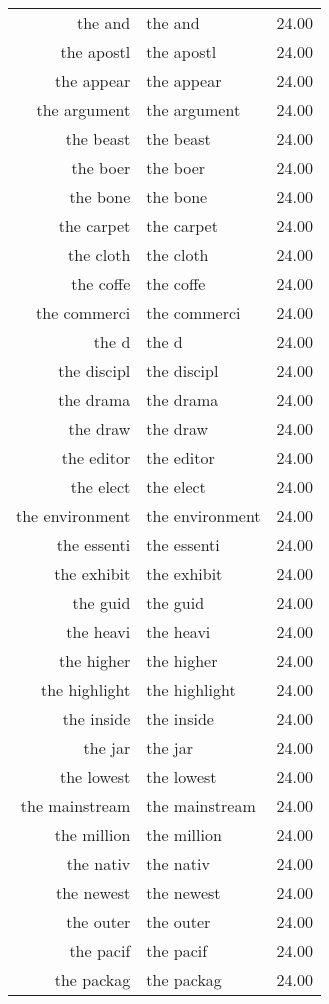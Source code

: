 \begin{table}[ht]
\begin{tabular}{rlr}
  the and & the and & 24.00 \\ 
  the apostl & the apostl & 24.00 \\ 
  the appear & the appear & 24.00 \\ 
  the argument & the argument & 24.00 \\ 
  the beast & the beast & 24.00 \\ 
  the boer & the boer & 24.00 \\ 
  the bone & the bone & 24.00 \\ 
  the carpet & the carpet & 24.00 \\ 
  the cloth & the cloth & 24.00 \\ 
  the coffe & the coffe & 24.00 \\ 
  the commerci & the commerci & 24.00 \\ 
  the d & the d & 24.00 \\ 
  the discipl & the discipl & 24.00 \\ 
  the drama & the drama & 24.00 \\ 
  the draw & the draw & 24.00 \\ 
  the editor & the editor & 24.00 \\ 
  the elect & the elect & 24.00 \\ 
  the environment & the environment & 24.00 \\ 
  the essenti & the essenti & 24.00 \\ 
  the exhibit & the exhibit & 24.00 \\ 
  the guid & the guid & 24.00 \\ 
  the heavi & the heavi & 24.00 \\ 
  the higher & the higher & 24.00 \\ 
  the highlight & the highlight & 24.00 \\ 
  the inside & the inside & 24.00 \\ 
  the jar & the jar & 24.00 \\ 
  the lowest & the lowest & 24.00 \\ 
  the mainstream & the mainstream & 24.00 \\ 
  the million & the million & 24.00 \\ 
  the nativ & the nativ & 24.00 \\ 
  the newest & the newest & 24.00 \\ 
  the outer & the outer & 24.00 \\ 
  the pacif & the pacif & 24.00 \\ 
  the packag & the packag & 24.00 \\ 

\end{tabular}
\end{table}

